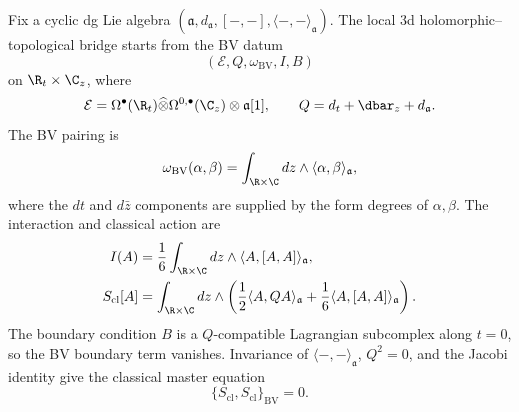 Fix a cyclic dg Lie algebra \((\mathfrak a,d_{\mathfrak a},[-,-],
\langle-,-\rangle_{\mathfrak a})\). The local 3d
holomorphic--topological bridge starts from the BV datum
\[
(\mathcal E,Q,\omega_{\mathrm{BV}},I,B)
\]
on \(\R_t\times\C_z\), where
\begin{equation}\label{eq:3dht-fields}
 \mathcal E
 =
 \Omega^\bullet(\R_t)\widehat\otimes
 \Omega^{0,\bullet}(\C_z)\otimes\mathfrak a[1],
 \qquad
 Q=d_t+\dbar_z+d_{\mathfrak a}.
\end{equation}
The BV pairing is
\begin{equation}\label{eq:3dht-bv-pairing}
 \omega_{\mathrm{BV}}(\alpha,\beta)
 =
 \int_{\R\times\C} dz\wedge
 \langle\alpha,\beta\rangle_{\mathfrak a},
\end{equation}
where the \(dt\) and \(d\bar z\) components are supplied by the form
degrees of \(\alpha,\beta\). The interaction and classical action are
\begin{align}
 I(A)
 &=
 \frac16\int_{\R\times\C}dz\wedge
 \langle A,[A,A]\rangle_{\mathfrak a},\label{eq:3dht-interaction}\\
 S_{\mathrm{cl}}[A]
 &=
 \int_{\R\times\C}dz\wedge
 \left(\frac12\langle A,QA\rangle_{\mathfrak a}
 +\frac16\langle A,[A,A]\rangle_{\mathfrak a}\right).
 \label{eq:3dht-classical-action}
\end{align}
The boundary condition \(B\) is a \(Q\)-compatible Lagrangian
subcomplex along \(t=0\), so the BV boundary term vanishes. Invariance
of \(\langle-,-\rangle_{\mathfrak a}\), \(Q^2=0\), and the Jacobi
identity give the classical master equation
\begin{equation}\label{eq:3dht-cme}
 \{S_{\mathrm{cl}},S_{\mathrm{cl}}\}_{\mathrm{BV}}=0.
\end{equation}

